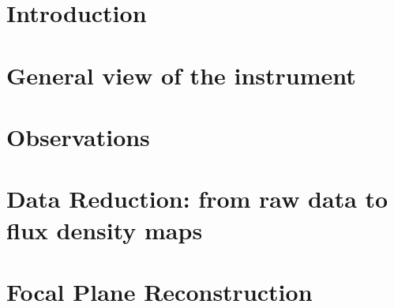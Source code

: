 \documentclass[traditionalabstract]{aa}
\begin{document}
   
\section{Introduction}
\label{se:intro}



\section{General view of the instrument}
\label{se:instru}



\section{Observations}
\label{se:observations}



\section{Data Reduction: from raw data to flux density maps}
\label{se:dataproc}


\section{Focal Plane Reconstruction}
\label{se:geometry}


\end{document}
